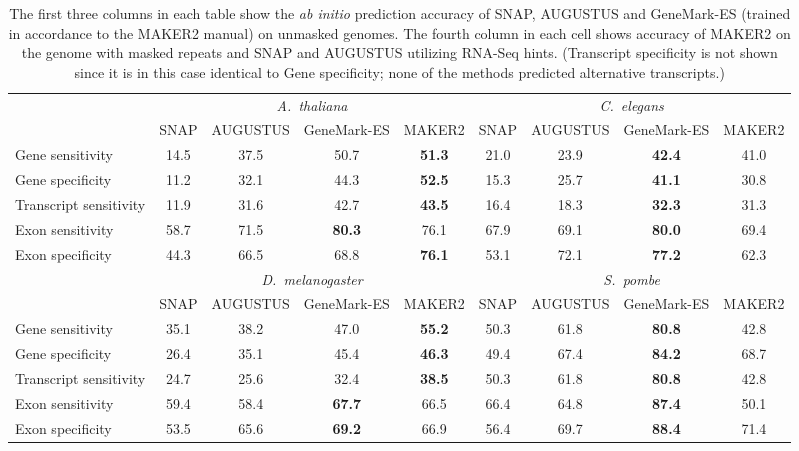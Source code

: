 \documentclass[a4paper,10pt]{report}
\begin{document}
\begin{table}[h!]
\begin{center}
 \begin{scriptsize}
 \begin{tabular}{|l|cccc|cccc|}
 \hline
& \multicolumn{4}{|c|}{\textit{A.~thaliana}} & \multicolumn{4}{|c|}{\textit{C.~elegans}}\\
& SNAP & AUGUSTUS & GeneMark-ES & MAKER2 & SNAP & AUGUSTUS & GeneMark-ES & MAKER2\\
\hline
Gene sensitivity        & 14.5 & 37.5 & 50.7 & \textbf{51.3} & 21.0 & 23.9 & \textbf{42.4} & 41.0\\
Gene specificity        & 11.2 & 32.1 & 44.3 & \textbf{52.5} & 15.3 & 25.7 & \textbf{41.1} & 30.8\\
Transcript sensitivity  & 11.9 & 31.6 & 42.7 & \textbf{43.5} & 16.4 & 18.3 & \textbf{32.3} & 31.3\\
Exon sensitivity        & 58.7 & 71.5 & \textbf{80.3} & 76.1 & 67.9 & 69.1 & \textbf{80.0} & 69.4\\
Exon specificity        & 44.3 & 66.5 & 68.8 & \textbf{76.1} & 53.1 & 72.1 & \textbf{77.2} & 62.3\\
\hline
& \multicolumn{4}{|c|}{\textit{D.~melanogaster}} & \multicolumn{4}{|c|}{\textit{S.~pombe}}\\
& SNAP & AUGUSTUS & GeneMark-ES & MAKER2 & SNAP & AUGUSTUS & GeneMark-ES & MAKER2\\
\hline
Gene sensitivity       & 35.1 & 38.2 & 47.0 & \textbf{55.2} & 50.3 & 61.8 & \textbf{80.8} & 42.8\\
Gene specificity       & 26.4 & 35.1 & 45.4 & \textbf{46.3} & 49.4 & 67.4 & \textbf{84.2} & 68.7\\
Transcript sensitivity & 24.7 & 25.6 & 32.4 & \textbf{38.5} & 50.3 & 61.8 & \textbf{80.8} & 42.8\\
Exon sensitivity       & 59.4 & 58.4 & \textbf{67.7} & 66.5 & 66.4 & 64.8 & \textbf{87.4} & 50.1\\
Exon specificity       & 53.5 & 65.6 & \textbf{69.2} & 66.9 & 56.4 & 69.7 & \textbf{88.4} & 71.4\\
\hline
 \end{tabular}
\end{scriptsize}
\end{center}
\caption{The first three columns in each table show the \textit{ab initio} prediction accuracy of SNAP, AUGUSTUS and GeneMark-ES (trained in accordance to the MAKER2 manual) on unmasked genomes. The fourth column in each cell shows accuracy of MAKER2 on the genome with masked repeats and SNAP and AUGUSTUS utilizing RNA-Seq hints. (Transcript specificity is not shown since it is in this case identical to Gene specificity; none of the methods predicted alternative transcripts.) \label{single_preds_maker}}
\end{table}
\end{document}
